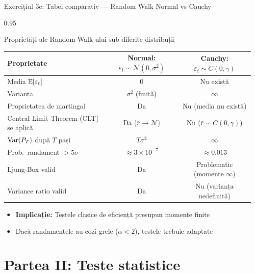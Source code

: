 \documentclass[9pt, aspectratio=169, t]{beamer}
\begin{document}
\begin{frame}{Exercițiul 3c: Tabel comparativ --- Random Walk Normal vs Cauchy}
    \begin{cminipage}{0.95\textwidth}
\begin{block}{Proprietăți ale Random Walk-ului sub diferite distribuții}
\renewcommand{\arraystretch}{1.2}
\begin{center}
\footnotesize
\begin{tabular}{lcc}
\toprule
\textbf{Proprietate} & \textbf{Normal: $\varepsilon_t \sim \mathcal{N}(0,\sigma^2)$} & \textbf{Cauchy: $\varepsilon_t \sim C(0,\gamma)$} \\
\midrule
Media $\mathbb{E}[\varepsilon_t]$ & $0$ & Nu există \\
Varianța & $\sigma^2$ (finită) & $\infty$ \\
Proprietatea de martingal & Da & Nu (media nu există) \\
Central Limit Theorem (CLT) se aplică & Da ($\bar{r} \to \mathcal{N}$) & Nu ($\bar{r} \sim C(0,\gamma)$) \\
$\text{Var}(P_T)$ după $T$ pași & $T\sigma^2$ & $\infty$ \\
Prob.\ randament $> 5\sigma$ & $\approx 3 \times 10^{-7}$ & $\approx 0.013$ \\
Ljung-Box valid & Da & Problematic (momente $\infty$) \\
Variance ratio valid & Da & Nu (varianța nedefinită) \\
\bottomrule
\end{tabular}
\end{center}
\end{block}

\vspace{0.1cm}
\begin{itemize}\setlength{\itemsep}{0pt}
    \item \textbf{Implicație:} Testele clasice de eficiență presupun momente finite
    \item Dacă randamentele au cozi grele ($\alpha < 2$), testele trebuie adaptate
\end{itemize}
    \end{cminipage}
\end{frame}

\section{Partea II: Teste statistice}
\end{document}
